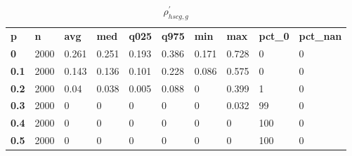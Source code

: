 \begin{table}[h]
 \centering 
\footnotesize
\caption{$\rho_{hscg,g}^\prime $}
\label{tab:alphahscgg}
\begin{tabular}[h]{| l l l l l l l l l l|
    } \hline
\textbf{ p} & \textbf{ n} & \textbf{ avg} & \textbf{ med} & \textbf{ q025} & \textbf{ q975} & \textbf{ min} & \textbf{ max} & \textbf{ pct\_0} & \textbf{ pct\_nan}
           \\
  \textbf{  0} & 2000 & 0.261 & 0.251 & 0.193 & 0.386 & 0.171 & 0.728 &   0 & 0
           \\
  \textbf{0.1} & 2000 & 0.143 & 0.136 & 0.101 & 0.228 & 0.086 & 0.575 &   0 & 0
           \\
  \textbf{0.2} & 2000 &  0.04 & 0.038 & 0.005 & 0.088 &     0 & 0.399 &   1 & 0
           \\
  \textbf{0.3} & 2000 &     0 &     0 &     0 &     0 &     0 & 0.032 &  99 & 0
           \\
  \textbf{0.4} & 2000 &     0 &     0 &     0 &     0 &     0 &     0 & 100 & 0
           \\
  \textbf{0.5} & 2000 &     0 &     0 &     0 &     0 &     0 &     0 & 100 & 0
           \\
 \hline \end{tabular}
 \end{table}
